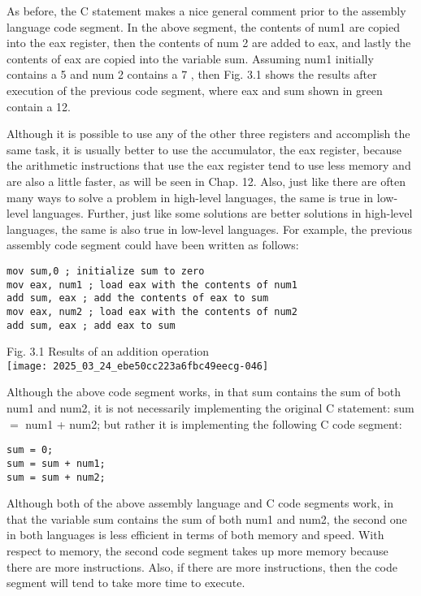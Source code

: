 \documentclass[10pt]{article}
\begin{document}
As before, the C statement makes a nice general comment prior to the assembly language code segment. In the above segment, the contents of num1 are copied into the eax register, then the contents of num 2 are added to eax, and lastly the contents of eax are copied into the variable sum. Assuming num1 initially contains a 5 and num 2 contains a 7 , then Fig. 3.1 shows the results after execution of the previous code segment, where eax and sum shown in green contain a 12.

Although it is possible to use any of the other three registers and accomplish the same task, it is usually better to use the accumulator, the eax register, because the arithmetic instructions that use the eax register tend to use less memory and are also a little faster, as will be seen in Chap. 12. Also, just like there are often many ways to solve a problem in high-level languages, the same is true in low-level languages. Further, just like some solutions are better solutions in high-level languages, the same is also true in low-level languages. For example, the previous assembly code segment could have been written as follows:

\begin{verbatim}
mov sum,0 ; initialize sum to zero
mov eax, num1 ; load eax with the contents of num1
add sum, eax ; add the contents of eax to sum
mov eax, num2 ; load eax with the contents of num2
add sum, eax ; add eax to sum
\end{verbatim}

Fig. 3.1 Results of an addition operation\\
\texttt{[image: 2025\_03\_24\_ebe50cc223a6fbc49eecg-046]}

Although the above code segment works, in that sum contains the sum of both num1 and num2, it is not necessarily implementing the original C statement: sum $=$ num1 + num2; but rather it is implementing the following C code segment:

\begin{verbatim}
sum = 0;
sum = sum + num1;
sum = sum + num2;
\end{verbatim}

Although both of the above assembly language and C code segments work, in that the variable sum contains the sum of both num1 and num2, the second one in both languages is less efficient in terms of both memory and speed. With respect to memory, the second code segment takes up more memory because there are more instructions. Also, if there are more instructions, then the code segment will tend to take more time to execute.
\end{document}
